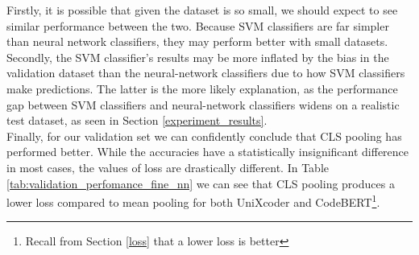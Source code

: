 \noindent
Firstly, it is possible that given the dataset is so small, we should expect to see similar performance between the two. Because SVM classifiers are far simpler than neural network classifiers, they may perform better with small datasets. \\

\noindent
Secondly, the SVM classifier's results may be more inflated by the bias in the validation dataset than the neural-network classifiers due to how SVM classifiers make predictions. The latter is the more likely explanation, as the performance gap between SVM classifiers and neural-network classifiers widens on a realistic test dataset, as seen in Section \ref{experiment_results}. \\

\noindent
Finally, for our validation set we can confidently conclude that CLS pooling has performed better. While the accuracies have a statistically insignificant difference in most cases, the values of loss are drastically different. In Table \ref{tab:validation_perfomance_fine_nn} we can see that CLS pooling produces a lower loss compared to mean pooling for both UniXcoder and CodeBERT\footnote{Recall from Section \ref{loss} that a lower loss is better}.